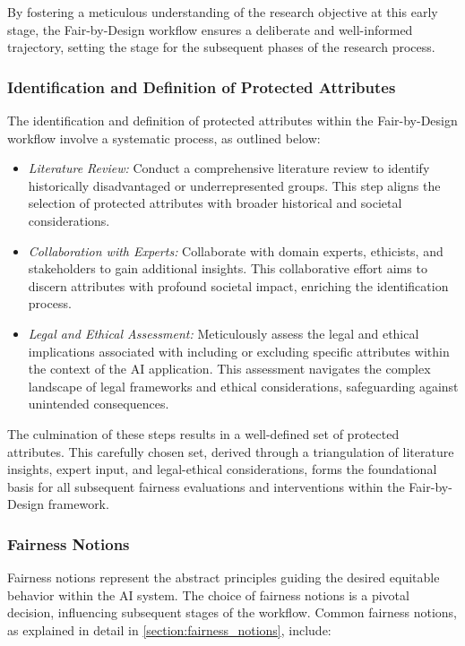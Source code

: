 By fostering a meticulous understanding of the research objective at this early stage, the Fair-by-Design workflow ensures a deliberate and well-informed trajectory, setting the stage for the subsequent phases of the research process.

\subsubsection{Identification and Definition of Protected Attributes}

The identification and definition of protected attributes within the Fair-by-Design workflow involve a systematic process, as outlined below:

\begin{itemize}
    \item \emph{Literature Review:} Conduct a comprehensive literature review to identify historically disadvantaged or underrepresented groups. This step aligns the selection of protected attributes with broader historical and societal considerations.
    
    \item \emph{Collaboration with Experts:} Collaborate with domain experts, ethicists, and stakeholders to gain additional insights. This collaborative effort aims to discern attributes with profound societal impact, enriching the identification process.
    
    \item \emph{Legal and Ethical Assessment:} Meticulously assess the legal and ethical implications associated with including or excluding specific attributes within the context of the AI application. This assessment navigates the complex landscape of legal frameworks and ethical considerations, safeguarding against unintended consequences.
\end{itemize}

The culmination of these steps results in a well-defined set of protected attributes. This carefully chosen set, derived through a triangulation of literature insights, expert input, and legal-ethical considerations, forms the foundational basis for all subsequent fairness evaluations and interventions within the Fair-by-Design framework.

\subsubsection{Fairness Notions}

Fairness notions represent the abstract principles guiding the desired equitable behavior within the AI system. The choice of fairness notions is a pivotal decision, influencing subsequent stages of the workflow. Common fairness notions, as explained in detail in \cref{section:fairness_notions}, include:

